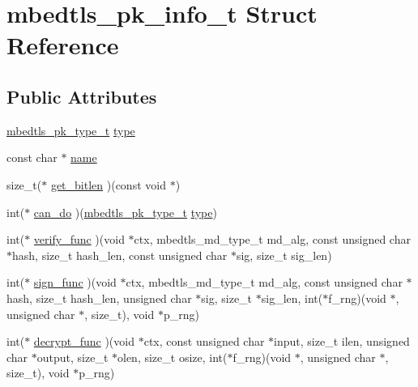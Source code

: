 \hypertarget{structmbedtls__pk__info__t}{\section{mbedtls\-\_\-pk\-\_\-info\-\_\-t Struct Reference}
\label{structmbedtls__pk__info__t}
}
\subsection*{Public Attributes}
\begin{DoxyCompactItemize}
\item 
\hyperlink{pk_8h_a3fe41eff5605ae727eb9d28dad297020}{mbedtls\-\_\-pk\-\_\-type\-\_\-t} \hyperlink{structmbedtls__pk__info__t_a1290aa516e4b5889952f56edf331c313}{type}
\item 
const char $\ast$ \hyperlink{structmbedtls__pk__info__t_a6390c0e7c7597efec2033fcbea53697c}{name}
\item 
size\-\_\-t($\ast$ \hyperlink{structmbedtls__pk__info__t_a6bba14dc93e95a56df97a5c9cfbbc972}{get\-\_\-bitlen} )(const void $\ast$)
\item 
int($\ast$ \hyperlink{structmbedtls__pk__info__t_a65e19ae2ef1eea61d69f9c2a6033191a}{can\-\_\-do} )(\hyperlink{pk_8h_a3fe41eff5605ae727eb9d28dad297020}{mbedtls\-\_\-pk\-\_\-type\-\_\-t} \hyperlink{structmbedtls__pk__info__t_a1290aa516e4b5889952f56edf331c313}{type})
\item 
int($\ast$ \hyperlink{structmbedtls__pk__info__t_ada03abbe988ff9c566ceec0f5f96e720}{verify\-\_\-func} )(void $\ast$ctx, mbedtls\-\_\-md\-\_\-type\-\_\-t md\-\_\-alg, const unsigned char $\ast$hash, size\-\_\-t hash\-\_\-len, const unsigned char $\ast$sig, size\-\_\-t sig\-\_\-len)
\item 
int($\ast$ \hyperlink{structmbedtls__pk__info__t_a84319d0e361748b3603d49ccabc39e54}{sign\-\_\-func} )(void $\ast$ctx, mbedtls\-\_\-md\-\_\-type\-\_\-t md\-\_\-alg, const unsigned char $\ast$hash, size\-\_\-t hash\-\_\-len, unsigned char $\ast$sig, size\-\_\-t $\ast$sig\-\_\-len, int($\ast$f\-\_\-rng)(void $\ast$, unsigned char $\ast$, size\-\_\-t), void $\ast$p\-\_\-rng)
\item 
int($\ast$ \hyperlink{structmbedtls__pk__info__t_a8d9dce2cb92def64ed2fb99dfe79c914}{decrypt\-\_\-func} )(void $\ast$ctx, const unsigned char $\ast$input, size\-\_\-t ilen, unsigned char $\ast$output, size\-\_\-t $\ast$olen, size\-\_\-t osize, int($\ast$f\-\_\-rng)(void $\ast$, unsigned char $\ast$, size\-\_\-t), void $\ast$p\-\_\-rng)

\end{DoxyCompactItemize}
